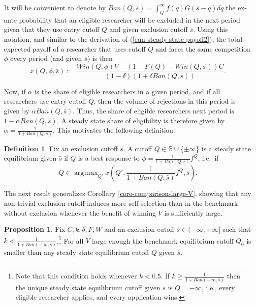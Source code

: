 \documentclass[12pt]{article}
\theoremstyle{plain}
\theoremstyle{definition}
\newtheorem{definition}{Definition}
\newtheorem{proposition}{Proposition}
\theoremstyle{remark}
\def\RR{\mathbb{R}}
\DeclareMathOperator*{\argmax}{arg\,max}
\begin{document}
It will be convenient to denote by $Ban(Q,\bar s) = \int_Q^{\infty} f(q)G(\bar s-q)dq$ the ex-ante probability that an eligible researcher will be excluded in the next period given that they use entry cutoff $Q$ and given exclusion cutoff $\bar s$. Using this notation, and similar to the derivation of (\ref{eqn-steady-state-payoff2}), the total expected payoff of a researcher that uses cutoff $Q$ and faces the same competition $\phi$ every period (and given $\bar s$) is then
$$x(Q,\phi,\bar s) := \frac{Win(Q,\phi)V-(1-F(Q)-Win(Q,\phi))C}{(1-\delta)(1+\delta Ban(Q,\bar s))}.$$

Now, if $\alpha$ is the share of eligible researchers in a given period, and if all researchers use entry cutoff $Q$, then the volume of rejections in this period is given by $\alpha Ban(Q,\bar s)$. Thus, the share of eligible researchers next period is $1-\alpha Ban(Q,\bar s)$. A steady state share of eligibility is therefore given by $\alpha = \frac{1}{1+Ban(Q,\bar s)}$. This motivates the following definition.

\begin{definition}\label{def-eq-noisy-review}
Fix an exclusion cutoff $\bar s$. A cutoff $Q\in \RR \cup \{\pm \infty\}$ is a steady state equilibrium given $\bar s$ if $Q$ is a best response to $\phi=\frac{1}{1+Ban(Q,\bar s)}f^Q$, i.e.\ if 
$$Q\in \argmax_{Q'} x\left(Q',\frac{1}{1+Ban(Q,\bar s)}f^Q,\bar s\right).$$
\end{definition}

The next result generalizes Corollary \ref{coro-comparison-large-V}, showing that any non-trivial exclusion cutoff induces more self-selection than in the benchmark without exclusion whenever the benefit of winning $V$ is sufficiently large. 

\begin{proposition}\label{prop-noisy-review-large-V}
Fix $C,k,\delta,F,W$ and an exclusion cutoff $\bar s\in (-\infty,+\infty]$ such that $k<\frac{1}{1+Ban(-\infty,\bar s)}$.\footnote{Note that this condition holds whenever $k<0.5$. If $k\ge\frac{1}{1+Ban(-\infty,\bar s)}$ then the unique steady state equilibrium cutoff given $\bar s$ is $Q=-\infty$, i.e., every eligible researcher applies, and every application wins.} For all $V$ large enough the benchmark equilibrium cutoff $Q_0$ is smaller than any steady state equilibrium cutoff $Q$ given $\bar s$. 
\end{proposition}
\end{document}
